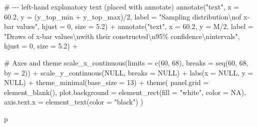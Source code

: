 \documentclass[
  letterpaper,
  DIV=11,
  numbers=noendperiod]{scrreprt}
\newenvironment{Shaded}{\begin{snugshade}}{\end{snugshade}}
\newcommand{\AttributeTok}[1]{\textcolor[rgb]{0.40,0.45,0.13}{#1}}
\newcommand{\CommentTok}[1]{\textcolor[rgb]{0.37,0.37,0.37}{#1}}
\newcommand{\ConstantTok}[1]{\textcolor[rgb]{0.56,0.35,0.01}{#1}}
\newcommand{\DecValTok}[1]{\textcolor[rgb]{0.68,0.00,0.00}{#1}}
\newcommand{\FloatTok}[1]{\textcolor[rgb]{0.68,0.00,0.00}{#1}}
\newcommand{\FunctionTok}[1]{\textcolor[rgb]{0.28,0.35,0.67}{#1}}
\newcommand{\NormalTok}[1]{\textcolor[rgb]{0.00,0.23,0.31}{#1}}
\newcommand{\SpecialCharTok}[1]{\textcolor[rgb]{0.37,0.37,0.37}{#1}}
\newcommand{\StringTok}[1]{\textcolor[rgb]{0.13,0.47,0.30}{#1}}
\begin{document}
\begin{Shaded}
\begin{Highlighting}[]
  \CommentTok{\# {-}{-}{-} left{-}hand explanatory text (placed with annotate)}
  \FunctionTok{annotate}\NormalTok{(}\StringTok{"text"}\NormalTok{, }\AttributeTok{x =} \FloatTok{60.2}\NormalTok{, }\AttributeTok{y =}\NormalTok{ (y\_top\_min }\SpecialCharTok{+}\NormalTok{ y\_top\_max)}\SpecialCharTok{/}\DecValTok{2}\NormalTok{,}
           \AttributeTok{label =} \StringTok{"Sampling distribution}\SpecialCharTok{\textbackslash{}n}\StringTok{of x{-}bar values"}\NormalTok{,}
           \AttributeTok{hjust =} \DecValTok{0}\NormalTok{, }\AttributeTok{size =} \FloatTok{5.2}\NormalTok{) }\SpecialCharTok{+}
  \FunctionTok{annotate}\NormalTok{(}\StringTok{"text"}\NormalTok{, }\AttributeTok{x =} \FloatTok{60.2}\NormalTok{, }\AttributeTok{y =}\NormalTok{ M}\SpecialCharTok{/}\DecValTok{2}\NormalTok{,}
           \AttributeTok{label =} \StringTok{"Draws of x{-}bar values}\SpecialCharTok{\textbackslash{}n}\StringTok{with their constructed}\SpecialCharTok{\textbackslash{}n}\StringTok{95\% confidence}\SpecialCharTok{\textbackslash{}n}\StringTok{intervals"}\NormalTok{,}
           \AttributeTok{hjust =} \DecValTok{0}\NormalTok{, }\AttributeTok{size =} \FloatTok{5.2}\NormalTok{) }\SpecialCharTok{+}

  \CommentTok{\# Axes and theme}
  \FunctionTok{scale\_x\_continuous}\NormalTok{(}\AttributeTok{limits =} \FunctionTok{c}\NormalTok{(}\DecValTok{60}\NormalTok{, }\DecValTok{68}\NormalTok{), }\AttributeTok{breaks =} \FunctionTok{seq}\NormalTok{(}\DecValTok{60}\NormalTok{, }\DecValTok{68}\NormalTok{, }\AttributeTok{by =} \DecValTok{2}\NormalTok{)) }\SpecialCharTok{+}
  \FunctionTok{scale\_y\_continuous}\NormalTok{(}\ConstantTok{NULL}\NormalTok{, }\AttributeTok{breaks =} \ConstantTok{NULL}\NormalTok{) }\SpecialCharTok{+}
  \FunctionTok{labs}\NormalTok{(}\AttributeTok{x =} \ConstantTok{NULL}\NormalTok{, }\AttributeTok{y =} \ConstantTok{NULL}\NormalTok{) }\SpecialCharTok{+}
  \FunctionTok{theme\_minimal}\NormalTok{(}\AttributeTok{base\_size =} \DecValTok{13}\NormalTok{) }\SpecialCharTok{+}
  \FunctionTok{theme}\NormalTok{(}
    \AttributeTok{panel.grid =} \FunctionTok{element\_blank}\NormalTok{(),}
    \AttributeTok{plot.background =} \FunctionTok{element\_rect}\NormalTok{(}\AttributeTok{fill =} \StringTok{"white"}\NormalTok{, }\AttributeTok{color =} \ConstantTok{NA}\NormalTok{),}
    \AttributeTok{axis.text.x =} \FunctionTok{element\_text}\NormalTok{(}\AttributeTok{color =} \StringTok{"black"}\NormalTok{)}
\NormalTok{  )}

\NormalTok{p}
\end{Highlighting}
\end{Shaded}
\end{document}
